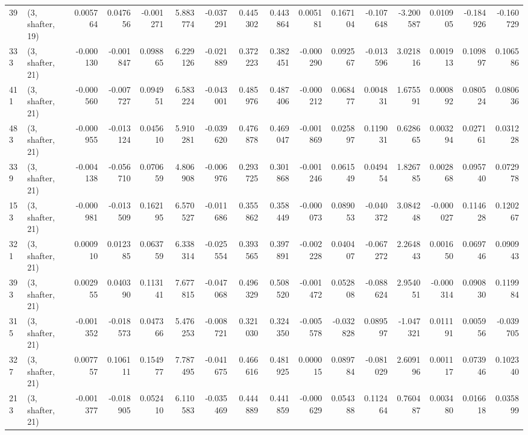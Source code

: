 \begin{tabular}{llrrrrrrrrrrrrrr}
39  &  (3, shafter, 19) &   0.005764 &  0.047656 & -0.001271 &    5.883774 & -0.037291 &   0.445302 &  0.443864 &  0.005181 &  0.167104 & -0.107648 &   -3.200587 &  0.010905 & -0.184926 & -0.160729 \\
333 &  (3, shafter, 21) &  -0.000130 & -0.001847 &  0.098865 &    6.229126 & -0.021889 &   0.372223 &  0.382451 & -0.000290 &  0.092567 & -0.013596 &    3.021816 &  0.001913 &  0.109897 &  0.106586 \\
411 &  (3, shafter, 21) &  -0.000560 & -0.007727 &  0.094951 &    6.583224 & -0.043001 &   0.485976 &  0.487406 & -0.000212 &  0.068477 &  0.004831 &    1.675591 &  0.000892 &  0.080524 &  0.080636 \\
483 &  (3, shafter, 21) &  -0.000955 & -0.013124 &  0.045610 &    5.910281 & -0.039620 &   0.476878 &  0.469047 & -0.001869 &  0.025897 &  0.119031 &    0.628665 &  0.003294 &  0.027161 &  0.031228 \\
339 &  (3, shafter, 21) &  -0.004138 & -0.056710 &  0.070659 &    4.806908 & -0.006976 &   0.293725 &  0.301868 & -0.001246 &  0.061549 &  0.049454 &    1.826785 &  0.002868 &  0.095740 &  0.072978 \\
153 &  (3, shafter, 21) &  -0.000981 & -0.013509 &  0.162195 &    6.570527 & -0.011686 &   0.355862 &  0.358449 & -0.000073 &  0.089053 & -0.040372 &    3.084248 & -0.000027 &  0.114628 &  0.120267 \\
321 &  (3, shafter, 21) &   0.000910 &  0.012385 &  0.063759 &    6.338314 & -0.025554 &   0.393565 &  0.397891 & -0.002228 &  0.040407 & -0.067272 &    2.264843 &  0.001650 &  0.069746 &  0.090943 \\
393 &  (3, shafter, 21) &   0.002955 &  0.040390 &  0.113141 &    7.677815 & -0.047068 &   0.496329 &  0.508520 & -0.001472 &  0.052808 & -0.088624 &    2.954051 & -0.000314 &  0.090830 &  0.119984 \\
315 &  (3, shafter, 21) &  -0.001352 & -0.018573 &  0.047366 &    5.476253 & -0.008721 &   0.321030 &  0.324350 & -0.005578 & -0.032828 &  0.089597 &   -1.047321 &  0.011191 &  0.005956 & -0.039705 \\
327 &  (3, shafter, 21) &   0.007757 &  0.106111 &  0.154977 &    7.787495 & -0.041675 &   0.466616 &  0.481925 &  0.000015 &  0.089784 & -0.081029 &    2.609196 &  0.001117 &  0.073946 &  0.102340 \\
213 &  (3, shafter, 21) &  -0.001377 & -0.018905 &  0.052410 &    6.110583 & -0.035469 &   0.444889 &  0.441859 & -0.000629 &  0.054388 &  0.112464 &    0.760487 &  0.003480 &  0.016618 &  0.035899 \\

\end{tabular}
